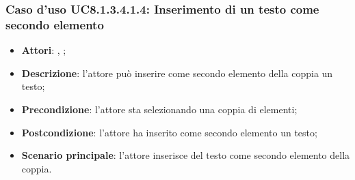 		\subsubsection{Caso d'uso UC8.1.3.4.1.4: Inserimento di un testo come secondo elemento}
		\label{UC8.1.3.4.1.4}
		\begin{itemize}
			\item \textbf{Attori}: \uau, \uaupro;
			\item \textbf{Descrizione}: l'attore può inserire come secondo elemento della coppia un testo;
			\item \textbf{Precondizione}: l'attore sta selezionando una coppia di elementi;
			\item \textbf{Postcondizione}: l'attore ha inserito come secondo elemento un testo;
			\item \textbf{Scenario principale}: l'attore inserisce del testo come secondo elemento della coppia.
		\end{itemize}
	
